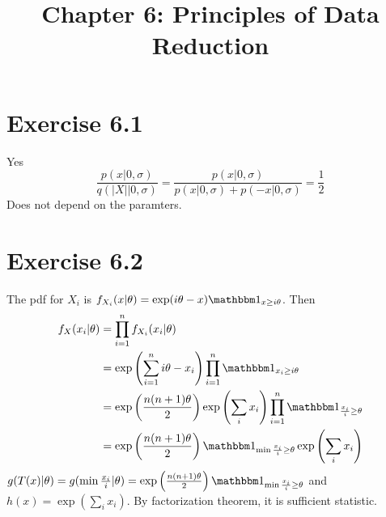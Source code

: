 \documentclass[12pt]{article}
\title{Chapter 6: Principles of Data Reduction}
\begin{document}
\maketitle

\section*{Exercise 6.1}
Yes
$$
 \frac{p(x|0,\sigma)}{q(|X| | 0, \sigma)} = \frac{p(x|0,\sigma)}{p(x| 0, \sigma) + p(-x|0, \sigma)} = \frac{1}{2}
$$
Does not depend on the paramters.

\section*{Exercise 6.2}
The pdf for $X_i$ is $f_{X_i}(x|\theta) = \exp(i\theta - x)\one_{x\geq i\theta}$. Then 
$$\begin{aligned}
   f_X(x_i|\theta) &= \prod_{i=1}^n f_{X_i}(x_i|\theta) \\
    	&=  \exp\left(\sum_{i=1}^n i\theta - x_i\right) \prod_{i=1}^n \one_{x_i \geq i\theta} \\ 
    	&=  \exp\left(\frac{n(n+1)\theta}{2}\right) \exp\left(\sum_i x_i\right)  \prod_{i=1}^n \one_{\frac{x_i}{i} \geq \theta} \\
    	&=  \exp\left(\frac{n(n+1)\theta}{2}\right)   \one_{\min \frac{x_i}{i} \geq \theta}  \exp\left(\sum_i x_i\right)
\end{aligned}
$$
$g(T(x)|\theta) = g(\min \frac{x_i}{i}|\theta) =  \exp\left(\frac{n(n+1)\theta}{2}\right)   \one_{\min \frac{x_i}{i} \geq \theta}$ and $h(x) = \exp\left(\sum_i x_i\right)$. By factorization theorem, it is sufficient statistic.
\end{document}
